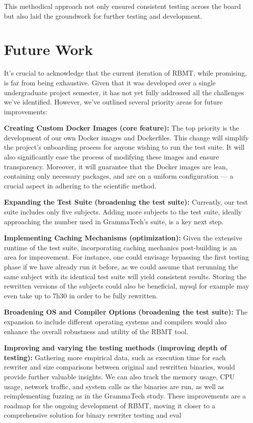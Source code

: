 \documentclass[a4paper,11pt,oneside]{report}
\begin{document}
This methodical approach not only ensured consistent testing across the board but also laid the groundwork for further testing and development.

\chapter{Future Work}

It's crucial to acknowledge that the current iteration of RBMT, while promising, is far
from being exhaustive. Given that it was developed over a single undergraduate project
semester, it has not yet fully addressed all the challenges we've identified. However, we've
outlined several priority areas for future improvements:

\textbf{Creating Custom Docker Images (core feature):} The top priority is the development
of our own Docker images and Dockerfiles. This change will simplify the project's
onboarding process for anyone wishing to run the test suite. It will also significantly ease the
process of modifying these images and ensure transparency. Moreover, it will guarantee
that the Docker images are lean, containing only necessary packages, and are on a uniform
configuration — a crucial aspect in adhering to the scientific method.

\textbf{Expanding the Test Suite (broadening the test suite):} Currently, our test suite
includes only five subjects. Adding more subjects to the test suite, ideally approaching the
number used in GrammaTech's suite, is a key next step.

\textbf{Implementing Caching Mechanisms (optimization):} Given the extensive runtime of
the test suite, incorporating caching mechanics post-building is an area for improvement.
For instance, one could envisage bypassing the first testing phase if we have already run it
before, as we could assume that rerunning the same subject with its identical test suite will
yield consistent results. Storing the rewritten versions of the subjects could also be
beneficial, mysql for example may even take up to 7h30 in order to be fully rewritten.

\textbf{Broadening OS and Compiler Options (broadening the test suite):} The expansion
to include different operating systems and compilers would also enhance the overall
robustness and utility of the RBMT tool.

\textbf{Improving and varying the testing methods (improving depth of testing):}
Gathering more empirical data, such as execution time for each rewriter and size
comparisons between original and rewritten binaries, would provide further valuable
insights. We can also track the memory usage, CPU usage, network traffic, and system calls
as the binaries are run, as well as reimplementing fuzzing as in the GrammaTech study.
These improvements are a roadmap for the ongoing development of RBMT, moving
it closer to a comprehensive solution for binary rewriter testing and eval
\end{document}

